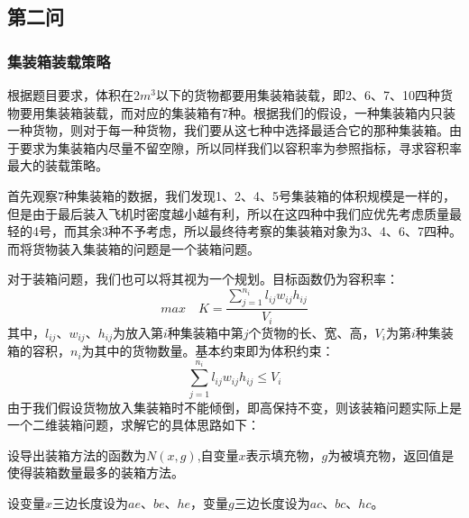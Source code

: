 \documentclass{article}
\begin{document}
	\newpage
	 \subsection{第二问}
	\subsubsection{集装箱装载策略}
	根据题目要求，体积在2$m^3$以下的货物都要用集装箱装载，即2、6、7、10四种货物要用集装箱装载，而对应的集装箱有7种。根据我们的假设，一种集装箱内只装一种货物，则对于每一种货物，我们要从这七种中选择最适合它的那种集装箱。由于要求为集装箱内尽量不留空隙，所以同样我们以容积率为参照指标，寻求容积率最大的装载策略。
	
	首先观察7种集装箱的数据，我们发现1、2、4、5号集装箱的体积规模是一样的，但是由于最后装入飞机时密度越小越有利，所以在这四种中我们应优先考虑质量最轻的4号，而其余3种不予考虑，所以最终待考察的集装箱对象为3、4、6、7四种。而将货物装入集装箱的问题是一个装箱问题。
	
	对于装箱问题，我们也可以将其视为一个规划。目标函数仍为容积率：
	\begin{equation}
		max\quad  K=\frac{\sum_{j=1}^{n_i}l_{ij}w_{ij}h_{ij}}{V_{i}}
	\end{equation}
	其中，$l_{ij}$、$w_{ij}$、$h_{ij}$为放入第$i$种集装箱中第$j$个货物的长、宽、高，$V_i$为第$i$种集装箱的容积，$n_i$为其中的货物数量。基本约束即为体积约束：
	\begin{equation}
		\sum_{j=1}^{n_i}l_{ij}w_{ij}h_{ij}\leq V_{i}
	\end{equation}
	由于我们假设货物放入集装箱时不能倾倒，即高保持不变，则该装箱问题实际上是一个二维装箱问题，求解它的具体思路如下：

	设导出装箱方法的函数为$N(x,g)$,自变量$x$表示填充物，$g$为被填充物，返回值是使得装箱数量最多的装箱方法。
	
	设变量$x$三边长度设为$ae$、$be$、$he$，变量$g$三边长度设为$ac$、$bc$、$hc$。
	\begin{figure}[!h]
		\centering 
	\end{figure}
\end{document}
